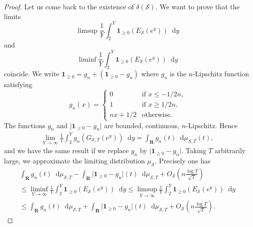\documentclass[a4paper,10pt]{amsart}
\theoremstyle{plain}
\theoremstyle{definition}
\begin{document}
\begin{proof}
Let us come back to the existence of $\delta(\mathcal{S})$.
We want to prove that the limits $$\limsup\frac{1}{Y}\int_{2}^{Y}\mathbf{1}_{\geq 0}(E_{\mathcal{S}}(e^{y})){\mathop{}\!\mathrm{d}} y$$
and
$$\liminf\frac{1}{Y}\int_{2}^{Y}\mathbf{1}_{\geq0}(E_{\mathcal{S}}(e^{y})){\mathop{}\!\mathrm{d}} y$$ coincide.
We write $\mathbf{1}_{\geq 0} = g_{n} + (\mathbf{1}_{\geq 0} - g_{n})$ where $g_n$ is the $n$-Lipschitz function satisfying
$$g_{n}(x)=\left\lbrace
\begin{array}{ll}
0 & \mbox{if $x\leq -1/2n$,}\\
1 & \mbox{if $x\geq 1/2n$,}\\
nx  + 1/2 & \mbox{otherwise.}
\end{array}
\right.$$
The functions $g_n$ and $\lvert \mathbf{1}_{\geq 0} - g_{n}\rvert$ are bounded, continuous, $n$-Lipschitz.
Hence
\begin{align*}
\lim_{Y\rightarrow\infty}\frac{1}{Y}\int_{2}^{Y} g_{n}(G_{\mathcal{S},T}(e^{y})){\mathop{}\!\mathrm{d}} y = \int_{\mathbf{R}}g_{n}(t){\mathop{}\!\mathrm{d}}\mu_{\mathcal{S},T}(t),
\end{align*}
and we have the same result if we replace $g_{n}$ by $\lvert \mathbf{1}_{\geq 0} - g_{n}\rvert$.
Taking $T$ arbitrarily large, we approximate the limiting distribution $\mu_{\mathcal{S}}$.
Precisely one has
\begin{multline}\label{Expr_Indic}
\int_{\mathbf{R}}g_{n}(t){\mathop{}\!\mathrm{d}}\mu_{\mathcal{S},T} - \int_{\mathbf{R}}\lvert \mathbf{1}_{\geq 0} - g_{n}\rvert(t){\mathop{}\!\mathrm{d}}\mu_{\mathcal{S},T}  + O_{\mathcal{S}}\left(n \frac{\log T}{\sqrt{T}} \right) \\ 
\leq
\liminf_{Y\rightarrow\infty} \frac{1}{Y}  \int_{2}^{Y}\mathbf{1}_{\geq 0}(E_{\mathcal{S}}(e^{y})) {\mathop{}\!\mathrm{d}} y 
\leq \limsup_{Y\rightarrow\infty} \frac{1}{Y}  \int_{2}^{Y}\mathbf{1}_{\geq 0}(E_{\mathcal{S}}(e^{y})) {\mathop{}\!\mathrm{d}} y \\ 
\leq
\int_{\mathbf{R}}g_{n}(t){\mathop{}\!\mathrm{d}}\mu_{\mathcal{S},T} + \int_{\mathbf{R}}\lvert \mathbf{1}_{\geq 0} - g_{n}\rvert(t){\mathop{}\!\mathrm{d}}\mu_{\mathcal{S},T} + O_{\mathcal{S}}\left(n \frac{\log T}{\sqrt{T}} \right).
\end{multline}


\end{proof}
\end{document}
